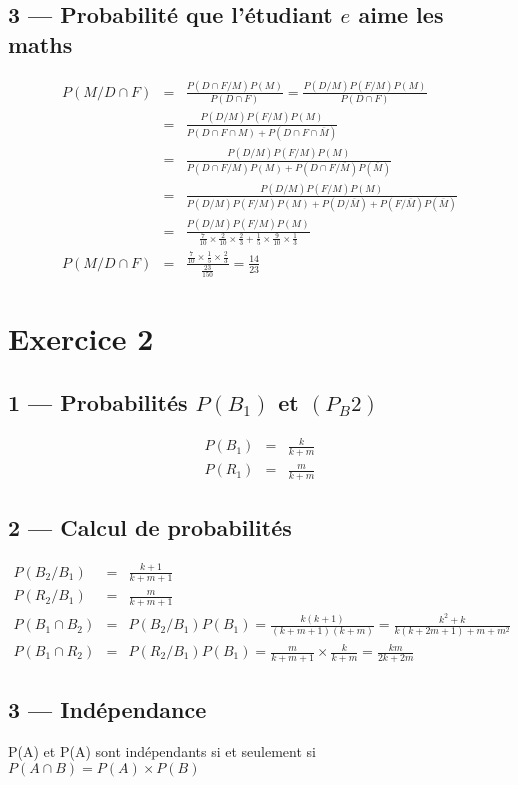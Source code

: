 \documentclass[a4paper, 11pt]{book}
\begin{document}
	\subsection*{3 --- Probabilité que l'étudiant $e$ aime les maths}
	\begin{eqnarray*}
		P(M/D\cap F) &=& \frac{P(D\cap F/M)P(M)}{P(D\cap F)} = \frac{P(D/M)P(F/M)P(M)}{P(D\cap F)}\\
		&=& \frac{P(D/M)P(F/M)P(M)}{P(D \cap F \cap M) + P(D\cap F\cap \overline M)}\\
		&=&  \frac{P(D/M)P(F/M)P(M)}{P(D\cap F/M)P(M) + P(D\cap F/\overline M)P(\overline M)}\\
		&=&  \frac{P(D/M)P(F/M)P(M)}{P(D/M)P(F/M)P(M) + P(D/\overline M) + P(F/\overline M)P(\overline M)}\\
		&=&  \frac{P(D/M)P(F/M)P(M)}{\frac{7}{10} \times \frac{2}{10} \times \frac{2}{3} + \frac{1}{5} \times \frac{9}{10} \times \frac{1}{3}}\\
		P(M/D\cap F) &=&  \frac{\frac{7}{10} \times \frac{1}{5} \times \frac{2}{3}}{\frac{23}{150}} = \frac{14}{23}
	\end{eqnarray*}
	\section*{Exercice 2}
	\subsection*{1 --- Probabilités $P(B_1)$ et $(P_B2)$}
	\begin{eqnarray*}
		P(B_1) &=& \frac{k}{k+m}\\
		P(R_1) &=&  \frac{m}{k+m}
	\end{eqnarray*}
	\subsection*{2 --- Calcul de probabilités}
	\begin{eqnarray*}
		P(B_2/B_1) &=& \frac{k+1}{k+m+1}\\
	P(R_2/B_1) &=&  \frac{m}{k+m+1}\\
	P(B_1 \cap B_2) &=& P(B_2/B_1)P(B_1) = \frac{k(k+1)}{(k+m+1)(k+m)} = \frac{k^2+k}{k(k+2m+1)+m+m^2} \\
	P(B_1 \cap R_2) &=&  P(R_2 / B_1) P(B_1) = \frac{m}{k+m+1} \times \frac{k}{k+m} = \frac{km}{2k+2m}
	\end{eqnarray*}
	\subsection*{3 --- Indépendance}
		P(A) et P(A) sont indépendants si et seulement si $P(A\cap B) = P(A) \times P(B)$
\end{document}
